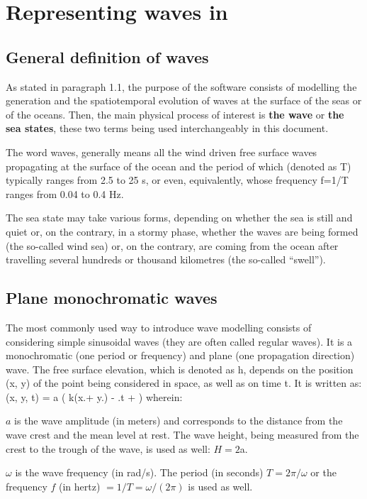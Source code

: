\chapter{  Representing waves in \tomawac }

\section{ General definition of waves}

 As stated in paragraph 1.1, the purpose of the \tomawac software consists of modelling the generation and the spatiotemporal evolution of waves at the surface of the seas or of the oceans. Then, the main physical process of interest is \textbf{the wave }or \textbf{the sea states}, these two terms being used interchangeably in this document.

 The word waves, generally means all the wind driven free surface waves propagating at the surface of the ocean and the period of which (denoted as T) typically ranges from 2.5 to 25 s, or even, equivalently, whose frequency f=1/T ranges from 0.04 to 0.4 Hz.

 The sea state may take various forms, depending on whether the sea is still and quiet or, on the contrary, in a stormy phase, whether the waves are being formed (the so-called wind sea) or, on the contrary, are coming from the ocean after travelling several hundreds or thousand kilometres (the so-called ``swell'').

\section{ Plane monochromatic waves}

 The most commonly used way to introduce wave modelling consists of considering simple sinusoidal waves (they are often called regular waves). It is a monochromatic (one period or frequency) and plane (one propagation direction) wave. The free surface elevation, which is denoted as h, depends on the position (x, y) of the point being considered in space, as well as on time t. It is written as:
\bequ
\label{eqmonochro}
\eta(x, y, t) = a \cos \left( k(x.\sin \theta + y.\cos \theta) - \omega.t + \phi \right) 
\eequ
 wherein:

 $a$ is the wave amplitude (in meters) and corresponds to the distance from the wave crest and the mean level at rest. The wave height, being measured from the crest to the trough of the wave, is used as well: $H=2$a.

 $\omega$ is the wave frequency (in rad/s). The period (in seconds) $T=2\pi/\omega$ or the frequency $f$ (in hertz) $= 1/T = \omega/(2\pi)$ is used as well.

